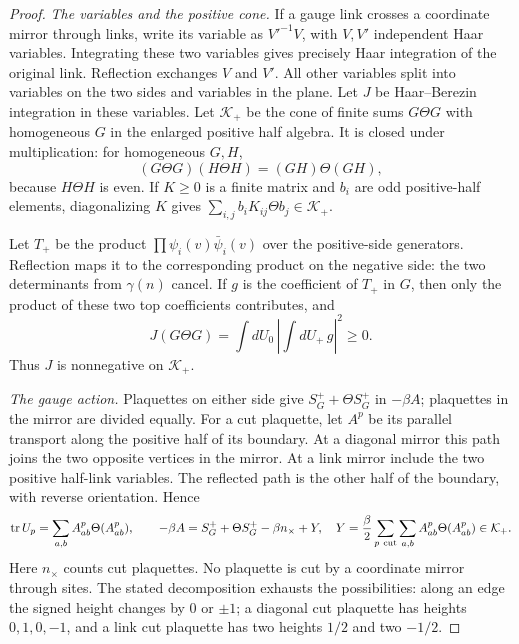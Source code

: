 \documentclass[11pt,letterpaper,reqno]{amsart}
\theoremstyle{definition}
\theoremstyle{remark}
\begin{document}
\begin{proof}
\emph{The variables and the positive cone.}
If a gauge link crosses a coordinate mirror through links, write its
variable as $V'^{-1}V$, with $V,V'$ independent Haar variables.
Integrating these two variables gives precisely Haar integration of
the original link. Reflection exchanges $V$ and $V'$. All other
variables split into variables on the two sides and variables in
the plane. Let $J$ be Haar--Berezin integration in these variables.
Let $\mathcal K_+$ be the cone of finite sums $G\Theta G$ with
homogeneous $G$ in the enlarged positive half algebra. It is closed
under multiplication: for homogeneous $G,H$,
\[
 (G\Theta G)(H\Theta H)=(GH)\Theta(GH),
\]
because $H\Theta H$ is even. If $K\ge0$ is a finite matrix and
$b_i$ are odd positive-half elements, diagonalizing $K$ gives
$\sum_{i,j}b_iK_{ij}\Theta b_j\in\mathcal K_+$.

Let $T_+$ be the product $\prod\psi_i(v)\bar\psi_i(v)$ over the
positive-side generators. Reflection maps it to the corresponding
product on the negative side: the two determinants from
$\gamma(n)$ cancel. If $g$ is the coefficient of $T_+$ in $G$,
then only the product of these two top coefficients contributes,
and
\[
 J(G\Theta G)=\int dU_0\,
                   \left|\int dU_+\,g\right|^2\ge0.
\]
Thus $J$ is nonnegative on $\mathcal K_+$.

\emph{The gauge action.}
Plaquettes on either side give $S_G^++\Theta S_G^+$ in
$-\beta A$; plaquettes in the mirror are divided equally.
For a cut plaquette, let $A^p$ be its parallel transport along the
positive half of its boundary. At a diagonal mirror this path joins
the two opposite vertices in the mirror. At a link mirror include
the two positive half-link variables. The reflected path is the
other half of the boundary, with reverse orientation. Hence
\[
 \operatorname{tr}U_p
       =\sum_{a,b}A^p_{ab}\Theta(A^p_{ab}),\qquad
 -\beta A=S_G^++\Theta S_G^+-\beta n_\times+Y,
 \quad
 Y=\frac\beta2\sum_{p\ {\rm cut}}\sum_{a,b}
                              A^p_{ab}\Theta(A^p_{ab})\in\mathcal K_+.
\]
Here $n_\times$ counts cut plaquettes. No plaquette is cut by a
coordinate mirror through sites. The stated decomposition exhausts
the possibilities: along an edge the signed height changes by
$0$ or $\pm1$; a diagonal cut plaquette has heights $0,1,0,-1$,
and a link cut plaquette has two heights $1/2$ and two $-1/2$.


\end{proof}
\end{document}

